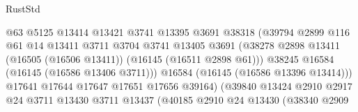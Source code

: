 \begin{lexlean}{RustStd}
\begin{coremodule}
                                            @63
                                            @5125
                                            @13414
                                            @13421
                                            @3741
                                            @13395
                                            @3691
                                            @38318
                                            (@39794
                                              @2899
                                              @116
                                              @61
                                              @14
                                              @13411
                                              @3711
                                              @3704
                                              @3741
                                              @13405
                                              @3691
                                              (@38278
                                                @2898
                                                @13411
                                                (@16505 (@16506 @13411))
                                                (@16145 (@16511 @2898 @61)))
                                              @38245
                                              @16584
                                              (@16145 (@16586 @13406 @3711)))
                                            @16584
                                            (@16145 (@16586 @13396 @13414)))
                                          @17641
                                          @17644
                                          @17647
                                          @17651
                                          @17656
                                          @39164)
                                        (@39840
                                          @13424
                                          @2910
                                          @2917
                                          @24
                                          @3711
                                          @13430
                                          @3711
                                          @13437
                                          (@40185
                                            @2910
                                            @24
                                            @13430
                                            (@38340
                                              @2909

\end{coremodule}
\end{lexlean}
